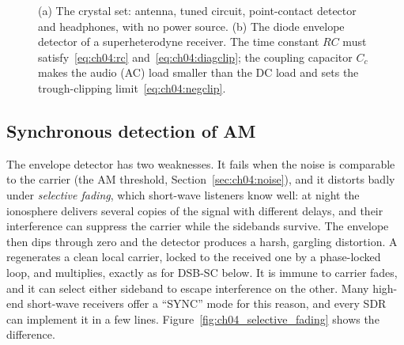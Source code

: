 \begin{figure}[htbp]
\caption{(a) The crystal set: antenna, tuned circuit, point-contact detector and headphones, with no
power source. (b) The diode envelope detector of a superheterodyne receiver. The time constant $RC$ must
satisfy~\eqref{eq:ch04:rc} and~\eqref{eq:ch04:diagclip}; the coupling capacitor $C_c$ makes the audio
(AC) load smaller than the DC load and sets the trough-clipping limit~\eqref{eq:ch04:negclip}.}
\label{fig:ch04_detector_circuits}
\end{figure}

\subsection{Synchronous detection of AM}

The envelope detector has two weaknesses. It fails when the noise is comparable to the carrier (the AM
threshold, Section~\ref{sec:ch04:noise}), and it distorts badly under \emph{selective fading}, which
short-wave listeners know well: at night the ionosphere delivers several copies of the signal with
different delays, and their interference can suppress the carrier while the sidebands survive. The
envelope then dips through zero and the detector produces a harsh, gargling distortion. A
 regenerates a clean local carrier, locked to the received one by a
phase-locked loop, and multiplies, exactly as for DSB-SC below. It is immune to carrier fades, and it
can select either sideband to escape interference on the other. Many high-end short-wave receivers offer a ``SYNC'' mode for this reason, and every SDR can implement it in a
few lines. Figure~\ref{fig:ch04_selective_fading} shows the difference.

